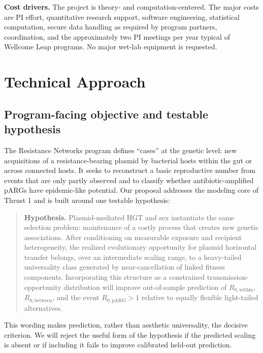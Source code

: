 \documentclass[12pt,a4paper]{article}
\newcommand{\Rwithin}{R_{0,\mathrm{within}}}
\newcommand{\Rbetween}{R_{0,\mathrm{between}}}
\newcommand{\RpARG}{R_{0,\mathrm{pARG}}}
\begin{document}
\textbf{Cost drivers.} The project is theory- and computation-centered. The major costs are PI effort, quantitative research support, software engineering, statistical computation, secure data handling as required by program partners, coordination, and the approximately two PI meetings per year typical of Wellcome Leap programs. No major wet-lab equipment is requested.

\newpage

\section{Technical Approach}

\subsection{Program-facing objective and testable hypothesis}

The Resistance Networks program defines ``cases'' at the genetic level: new acquisitions of a resistance-bearing plasmid by bacterial hosts within the gut or across connected hosts. It seeks to reconstruct a basic reproductive number from events that are only partly observed and to classify whether antibiotic-amplified pARGs have epidemic-like potential. Our proposal addresses the modeling core of Thrust 1 and is built around one testable hypothesis:

\begin{quote}
\textbf{Hypothesis.} Plasmid-mediated HGT and sex instantiate the same selection problem: maintenance of a costly process that creates new genetic associations. After conditioning on measurable exposure and recipient heterogeneity, the realized evolutionary opportunity for plasmid horizontal transfer belongs, over an intermediate scaling range, to a heavy-tailed universality class generated by near-cancellation of linked fitness components. Incorporating this structure as a constrained transmission-opportunity distribution will improve out-of-sample prediction of $\Rwithin$, $\Rbetween$, and the event $\RpARG>1$ relative to equally flexible light-tailed alternatives.
\end{quote}

This wording makes prediction, rather than aesthetic universality, the decisive criterion. We will reject the useful form of the hypothesis if the predicted scaling is absent or if including it fails to improve calibrated held-out prediction.
\end{document}
